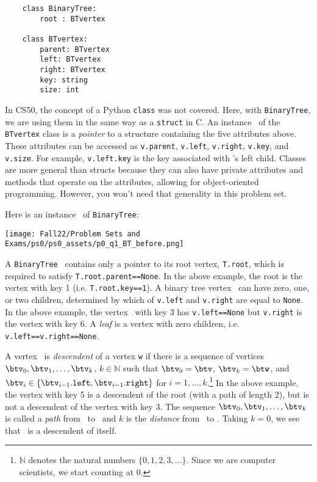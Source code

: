 \documentclass[11pt]{article}
\begin{document}
\begin{enumerate}
 \begin{verbatim}
    class BinaryTree:
        root : BTvertex
 
    class BTvertex:
        parent: BTvertex
        left: BTvertex
        right: BTvertex
        key: string
        size: int
 \end{verbatim}

 In CS50, the concept of a Python \texttt{class} was not covered. Here, with \texttt{BinaryTree}, we are using them in the same way as a \texttt{struct} in C. An instance \btv\  of the \texttt{BTvertex} class is a {\em pointer} to a structure containing the five attributes above. These attributes can be accessed as \texttt{v.parent}, \texttt{v.left}, \texttt{v.right}, \texttt{v.key}, and \texttt{v.size}. 
 For example, \texttt{v.left.key} is the key associated with \btv's left child.  
 Classes are more general than structs because they can also have private attributes and methods that operate on the attributes, allowing for object-oriented programming. However, you won't need that generality in this problem set.

 Here is an instance \treeeT\ of \texttt{BinaryTree}:
 
 \texttt{[image: Fall22/Problem Sets and Exams/ps0/ps0\_assets/p0\_q1\_BT\_before.png]}

 A \texttt{BinaryTree} \treeT\  contains only a pointer to its root vertex, \texttt{T.root}, which is required to satisfy \texttt{T.root.parent==None}. In the above example, 
 the root is the vertex with key 1 (i.e. \texttt{T.root.key==1}).
 A binary tree vertex \btv\ can have zero, one, or two children, determined by which of \texttt{v.left} and  \texttt{v.right} are equal to \texttt{None}.    In the above example, the vertex \btv\ with key 3 has 
 \texttt{v.left==None} but \texttt{v.right} is the vertex with key 6.
 A {\em leaf} is a vertex with zero children, i.e. \texttt{v.left==v.right==None}. 
 
 A vertex \btw\ is {\em descendent} of a vertex \texttt{w} if there is a sequence of vertices $\btv_0,\btv_1,\ldots,\btv_k$, $k\in \mathbb{N}$ such that $\btv_0=\btv$, $\btv_k=\btw$, and 
 $\btv_i \in \{\btv_{i-1}.\texttt{left},\btv_{i-1}.\texttt{right}\}$ for $i=1,\ldots,k$.\footnote{$\mathbb{N}$ denotes the natural numbers $\{0,1,2,3,\ldots\}$.  Since we are computer scientists, we start counting at 0.}
 In the above example, the vertex with key 5 is a descendent of the root (with a path of length 2), but is not a descendent of the vertex with key 3.
 The sequence $\btv_0,\btv_1,\ldots,\btv_k$ is called a {\em path} from \btv\ to \btw\ and $k$ is the {\em distance} from \btv\ to \btw. Taking $k=0$, we see that \btv\ is a descendent of itself.


\end{enumerate}
\end{document}
